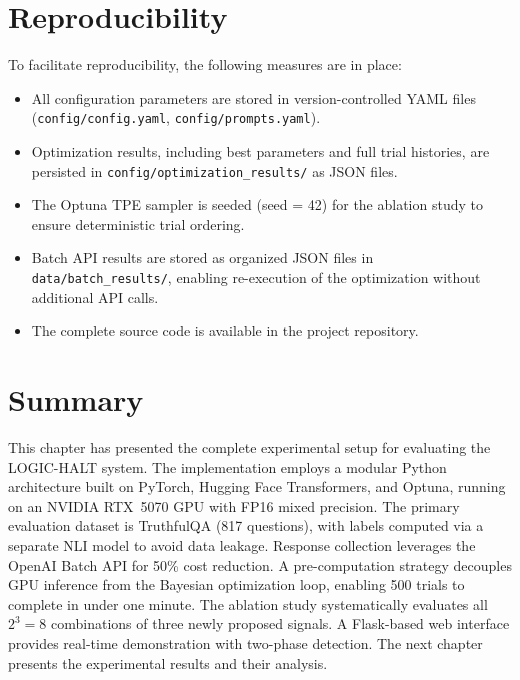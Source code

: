 \section{Reproducibility}
\label{sec:reproducibility}

To facilitate reproducibility, the following measures are in place:

\begin{itemize}
    \item All configuration parameters are stored in version-controlled YAML files (\texttt{config/config.yaml}, \texttt{config/prompts.yaml}).
    \item Optimization results, including best parameters and full trial histories, are persisted in \texttt{config/optimization\_results/} as JSON files.
    \item The Optuna TPE sampler is seeded (seed = 42) for the ablation study to ensure deterministic trial ordering.
    \item Batch API results are stored as organized JSON files in \texttt{data/batch\_results/}, enabling re-execution of the optimization without additional API calls.
    \item The complete source code is available in the project repository.
\end{itemize}

\section{Summary}

This chapter has presented the complete experimental setup for evaluating the LOGIC-HALT system. The implementation employs a modular Python architecture built on PyTorch, Hugging Face Transformers, and Optuna, running on an NVIDIA RTX~5070 GPU with FP16 mixed precision. The primary evaluation dataset is TruthfulQA (817 questions), with labels computed via a separate NLI model to avoid data leakage. Response collection leverages the OpenAI Batch API for 50\% cost reduction. A pre-computation strategy decouples GPU inference from the Bayesian optimization loop, enabling 500 trials to complete in under one minute. The ablation study systematically evaluates all $2^3 = 8$ combinations of three newly proposed signals. A Flask-based web interface provides real-time demonstration with two-phase detection. The next chapter presents the experimental results and their analysis.

